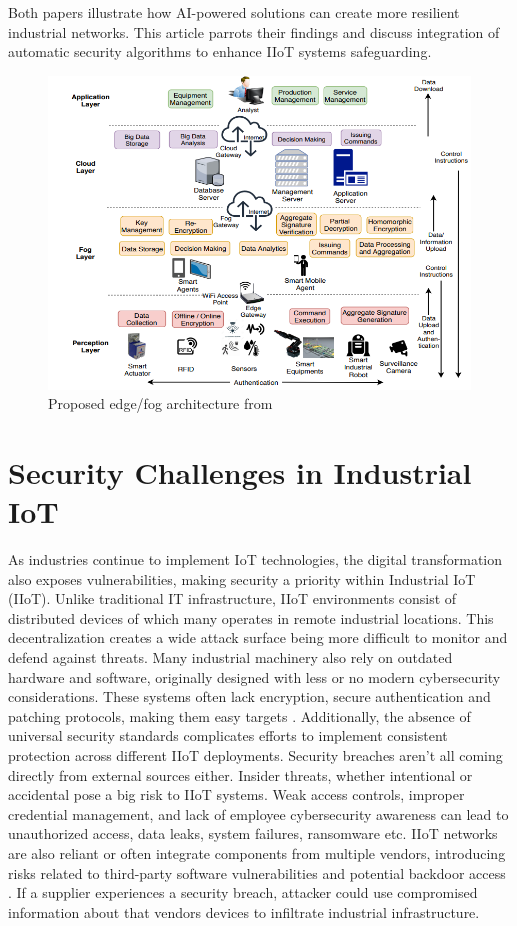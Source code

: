 \documentclass[article,a4paper]{IEEEtran}
\begin{document}
Both papers illustrate how AI-powered solutions can create more resilient industrial networks. This article parrots their findings and discuss integration of automatic security algorithms to enhance IIoT systems safeguarding.
\begin{figure}
    \includegraphics[width=\columnwidth]{Fog-basedarchitecture.png}
    \caption{ Proposed edge/fog architecture from \cite{fog} }
    \label{fig3: Architecture }
\end{figure}
\section{Security Challenges in Industrial IoT}
As industries continue to implement IoT technologies, the digital transformation also exposes vulnerabilities, making security a priority within Industrial IoT (IIoT). Unlike traditional IT infrastructure, IIoT environments consist of distributed devices of which many operates in remote industrial locations. This decentralization creates a wide attack surface being more difficult to monitor and defend against threats. 
\newline\newline
Many industrial machinery also rely on outdated hardware and software, originally designed with less or no modern cybersecurity considerations. These systems often lack encryption, secure authentication and patching protocols, making them easy targets \cite{SurveySecurity}. Additionally, the absence of universal security standards complicates efforts to implement consistent protection across different IIoT deployments. Security breaches aren't all coming directly from external sources either. Insider threats, whether intentional or accidental pose a big risk to IIoT systems. Weak access controls, improper credential management, and lack of employee cybersecurity awareness can lead to unauthorized access, data leaks, system failures, ransomware etc. 
\newline\newline
IIoT networks are also reliant or often integrate components from multiple vendors, introducing risks related to third-party software vulnerabilities and potential backdoor access \cite{fog}. If a supplier experiences a security breach, attacker could use compromised information about that vendors devices to infiltrate industrial infrastructure.
\end{document}
